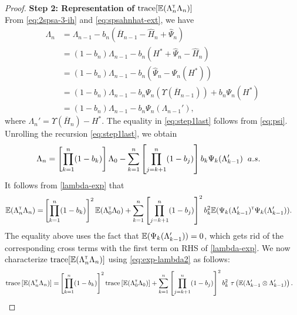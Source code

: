 \begin{proof}
\noindent\textbf{Step 2: Representation of $\text{trace}[\mathbb{E} (\Lambda_n ^\mathsf{\scriptscriptstyle T} \Lambda_n)]$} \\
 From \eqref{eq:2spsa-3-ih} and \eqref{eq:spsahnhat-ext},  we have
 \begin{align}
 \Lambda_n &= \Lambda_{n-1} - b_n ( \overline H_{n-1} - \hat H_n + \hat \Psi_n) \nonumber\\
&= (1-b_n) \Lambda_{n-1} - b_n (H^* + \hat \Psi_n - \hat H_n ) \nonumber\\&= (1-b_n) \Lambda_{n-1} - b_n (\hat \Psi_n - \Psi_n(H^*)) \nonumber\\&= (1-b_n) \Lambda_{n-1} - b_n \Psi_n(\Upsilon(\overline H_{n-1})) + b_n \Psi_n(H^*) \nonumber\\
&= (1-b_n) \Lambda_{n-1} - b_n\Psi_n(\Lambda_{n-1}'),\label{eq:step1last}
 \end{align}
where $\Lambda_n' = \Upsilon(\overline H_n) - H^*$.
The equality in \eqref{eq:step1last} follows from \eqref{eq:psi}. 
Unrolling the recursion \eqref{eq:step1last}, we obtain 
 \begin{align}\label{lambda-exp}
  \Lambda_n  = \left[ \prod_{k=1}^n (1-b_k) \right]\Lambda_0 
&- \sum_{k=1}^n \left[\prod_{j=k+1}^n (1-b_j)\right] b_k \Psi_k(\Lambda_{k-1}')  \hspace{0.2cm} a.s.
 \end{align}
It follows from \eqref{lambda-exp} that 
 \begin{align}
  \mathbb{E} (\Lambda_n ^\mathsf{\scriptscriptstyle T} \Lambda_n) =  &\left[ \prod_{k=1}^n (1-b_k) \right]^2 \mathbb{E} (\Lambda_0 ^\mathsf{\scriptscriptstyle T} \Lambda_0) + \sum_{k=1}^n \left[\prod_{j=k+1}^n (1-b_j)\right]^2 b_k^2   \mathbb{E} (\Psi_k(\Lambda_{k-1}') ^\mathsf{\scriptscriptstyle T} \Psi_k(\Lambda_{k-1}')).\label{eq:exp-lambda2}
 \end{align}
The equality above uses the fact that $\mathbb{E}(\Psi_k(\Lambda_{k-1}'))=0$, which gets rid of the corresponding cross terms with the first term on RHS of \eqref{lambda-exp}. %
We now characterize $\text{trace}[\mathbb{E}(\Lambda_n^\mathsf{\scriptscriptstyle T} \Lambda_n)]$ using \eqref{eq:exp-lambda2} as follows:
 \begin{align}\label{eq:trace}
 \text{trace} \left[\E (\Lambda_n \tr \Lambda_n)\right] = &\left[ \prod_{k=1}^n (1-b_k) \right]^2 \text{trace} \left[\E (\Lambda_0 \tr \Lambda_0)\right]  + \sum_{k=1}^n \left[\prod_{j=k+1}^n (1-b_j)\right]^2 b_k^2  \,\,\tau\left(\E (\Lambda_{k-1}' \otimes \Lambda_{k-1}')\right).

\end{align}
\end{proof}
